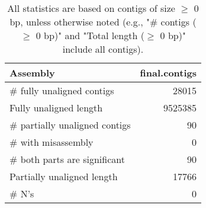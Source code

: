 \documentclass[12pt,a4paper]{article}
\begin{document}
\begin{table}[ht]
\begin{center}
\caption{All statistics are based on contigs of size $\geq$ 0 bp, unless otherwise noted (e.g., "\# contigs ($\geq$ 0 bp)" and "Total length ($\geq$ 0 bp)" include all contigs).}
\begin{tabular}{|l*{1}{|r}|}
\hline
Assembly & final.contigs \\ \hline
\# fully unaligned contigs & 28015 \\ \hline
Fully unaligned length & 9525385 \\ \hline
\# partially unaligned contigs & 90 \\ \hline
\hspace{5mm}\# with misassembly & 0 \\ \hline
\hspace{5mm}\# both parts are significant & 90 \\ \hline
Partially unaligned length & 17766 \\ \hline
\# N's & 0 \\ \hline
\end{tabular}
\end{center}
\end{table}
\end{document}
